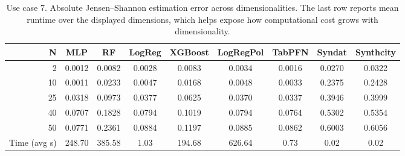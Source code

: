\begin{table}[ht]
\centering
\small
\setlength{\tabcolsep}{3pt}
\caption{Use case 7. Absolute Jensen--Shannon estimation error across dimensionalities. The last row reports mean runtime over the displayed dimensions, which helps expose how computational cost grows with dimensionality.}
\label{tab:uc7_abs_error_no_gt}
\begin{tabular}{rcccccccc}
\toprule
N & MLP & RF & LogReg & XGBoost & LogRegPol & TabPFN & Syndat & Synthcity \\
\midrule
2 & 0.0012 & 0.0082 & 0.0028 & 0.0083 & 0.0034 & 0.0016 & 0.0270 & 0.0322 \\
10 & 0.0011 & 0.0233 & 0.0047 & 0.0168 & 0.0048 & 0.0033 & 0.2375 & 0.2428 \\
25 & 0.0318 & 0.0973 & 0.0377 & 0.0625 & 0.0370 & 0.0337 & 0.3946 & 0.3999 \\
40 & 0.0707 & 0.1828 & 0.0794 & 0.1019 & 0.0794 & 0.0764 & 0.5302 & 0.5354 \\
50 & 0.0771 & 0.2361 & 0.0884 & 0.1197 & 0.0885 & 0.0862 & 0.6003 & 0.6056 \\
Time (avg s) & 248.70 & 385.58 & 1.03 & 194.68 & 626.64 & 0.73 & 0.02 & 0.02 \\
\bottomrule
\end{tabular}
\end{table}
